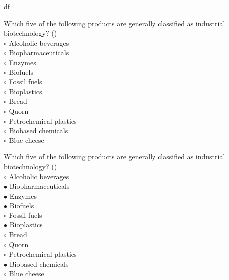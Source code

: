 df\documentclass[]{beamer}
\begin{document}
\begin{CJK}{UTF8}{gbsn}
\begin{frame}[shrink] {}
\addtocounter{questions}{1}
\color{blue}
Which five of the following products are generally classified as industrial biotechnology?
({})\\
\color{black}
\setlength{\parindent}{-0.4cm}
{\color{red}$\circ$} Alcoholic beverages  \\
{\color{red}$\circ$}  Biopharmaceuticals  \\
{\color{red}$\circ$}  Enzymes   \\
{\color{red}$\circ$}  Biofuels  \\
{\color{red}$\circ$} Fossil fuels  \\
{\color{red}$\circ$}  Bioplastics  \\
{\color{red}$\circ$} Bread  \\
{\color{red}$\circ$} Quorn  \\
{\color{red}$\circ$} Petrochemical plastics  \\
{\color{red}$\circ$}  Biobased chemicals  \\
{\color{red}$\circ$} Blue cheese  \\
\end{frame}
\begin{frame}[shrink] {}
\addtocounter{answers}{1}
\color{blue}
Which five of the following products are generally classified as industrial biotechnology?
({})\\
\color{black}
\setlength{\parindent}{-0.4cm}
{\color{red}$\circ$} Alcoholic beverages  \\
{\color{red}$\bullet$} Biopharmaceuticals  \\
{\color{red}$\bullet$} Enzymes   \\
{\color{red}$\bullet$} Biofuels  \\
{\color{red}$\circ$} Fossil fuels  \\
{\color{red}$\bullet$} Bioplastics  \\
{\color{red}$\circ$} Bread  \\
{\color{red}$\circ$} Quorn  \\
{\color{red}$\circ$} Petrochemical plastics  \\
{\color{red}$\bullet$} Biobased chemicals  \\
{\color{red}$\circ$} Blue cheese  \\
\end{frame}



\end{CJK}
\end{document}
